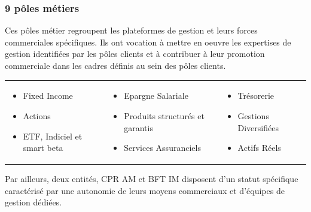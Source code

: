 \documentclass[12pt,a4paper]{report}
\begin{document}
\subsubsection{9 pôles métiers}
Ces pôles métier regroupent les plateformes de gestion et leurs forces commerciales spécifiques. Ils ont vocation à mettre en oeuvre les expertises de gestion identifiées par les pôles clients et à contribuer à leur promotion commerciale dans les cadres définis au sein des pôles clients.
\newline
\begin{tabular}{p{}p{}p{}}
\flushleft 
\begin{itemize}
\item Fixed Income
\item Actions
\item ETF, Indiciel et smart beta
\end{itemize}
&\begin{center}
\begin{itemize}
\item Epargne Salariale
\item Produits structurés et garantis
\item Services Assuranciels
\end{itemize}
\end{center}
& \flushright
\begin{itemize}
\item Trésorerie
\item Gestions Diversifiées
\item Actifs Réels
\end{itemize}

\end{tabular}
Par ailleurs, deux entités, CPR AM et BFT IM disposent d’un statut spécifique caractérisé par une autonomie de leurs moyens commerciaux et d’équipes de gestion dédiées.
\end{document}
